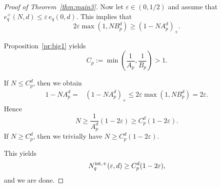 \documentclass[12pt]{article}
\theoremstyle{remark}
\theoremstyle{definition}
\newcommand{\<}{\langle}
\renewcommand{\>}{\rangle}
\begin{document}
\begin{proof}[Proof of Theorem~\ref{thm:main3}]
Now let $\varepsilon \in (0,1/2)$ and assume that $e_q^+(N,d) \le \varepsilon \, e_q(0,d)$. This implies that
$$2 \varepsilon  \max \left(1, 
N B_p^d\right)  \ge  \left(1 - N A_p^d\right)_+.$$

Proposition~\ref{pr:big1} yields
\begin{equation*}%
C_p:=\min\left(\frac{1}{A_p},\frac{1}{B_p}\right) >1.
\end{equation*}

If $N \le C_p^d$, then we obtain
\begin{align*}
1- N A_p^d  = & \left(1 - N A_p^d\right)_+ \le 2 \varepsilon \max \left(1, N B_p^d\right) =  2 \varepsilon. 
\end{align*}
Hence $$N \ge \frac{1}{A_p^d} (1-2 \varepsilon) \ge C_p^d (1-2 \varepsilon).$$
If $N \ge C_p^d$, then we trivially have $N \ge C_p^d (1-2 \varepsilon)$.
 
This yields $$N_q^{{\rm int},+}(\varepsilon,d)\ge C_p^d (1-2 \varepsilon),$$ and we are done.
\end{proof}
\end{document}
